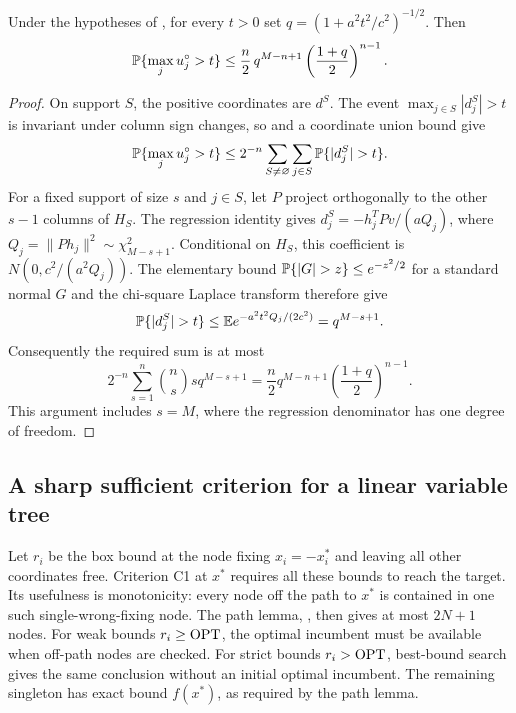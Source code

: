 \begin{theorem}
\label{bls:nnls-tail}
Under the hypotheses of , for every $t>0$ set
$q=(1+a^2t^2/c^2)^{-1/2}$.  Then
\begin{equation}
 \mathbb{P}\{\max_j u_j^\circ>t\}
 \le\frac n2\,q^{M-n+1}\left(\frac{1+q}{2}\right)^{n-1}.
 \label{bls:maximum-tail}
\end{equation}
\end{theorem}

\begin{proof}
On support $S$, the positive coordinates are $d^S$.  The event
$\max_{j\in S}|d_j^S|>t$ is invariant under column sign changes, so
 and a coordinate union bound give
\[
 \Pbb\{\max_j u_j^\circ>t\}
 \le2^{-n}\sum_{S\ne\varnothing}\sum_{j\in S}
                   \Pbb\{|d_j^S|>t\}.
\]
For a fixed support of size $s$ and $j\in S$, let $P$ project orthogonally
to the other $s-1$ columns of $H_S$.  The regression identity gives
$d_j^S=-h_j^TPv/(aQ_j)$, where $Q_j=\|Ph_j\|^2\sim\chi^2_{M-s+1}$.
Conditional on $H_S$, this coefficient is
$N(0,c^2/(a^2Q_j))$.  The elementary bound
$\Pbb\{|G|>z\}\le e^{-z^2/2}$ for a standard normal $G$ and the
chi-square Laplace transform therefore give
\[
 \Pbb\{|d_j^S|>t\}
 \le\E e^{-a^2t^2Q_j/(2c^2)}=q^{M-s+1}.
\]
Consequently the required sum is at most
\[
 2^{-n}\sum_{s=1}^n\binom ns s q^{M-s+1}
 =\frac n2 q^{M-n+1}\left(\frac{1+q}{2}\right)^{n-1}.
\]
This argument includes $s=M$, where the regression denominator has one
degree of freedom.
\end{proof}

\subsection{A sharp sufficient criterion for a linear variable tree}
\label{bls:linear-trees}

Let $r_i$ be the box bound at the node fixing $x_i=-x_i^*$ and leaving
all other coordinates free.  Criterion C1 at $x^*$ requires all these
bounds to reach the target.  Its usefulness is monotonicity: every node
off the path to $x^*$ is contained in one such single-wrong-fixing node.
The path lemma, , then gives at most $2N+1$ nodes.
For weak bounds $r_i\ge\operatorname{OPT}$, the optimal incumbent must be available
when off-path nodes are checked.  For strict bounds $r_i>\operatorname{OPT}$, best-bound
search gives the same conclusion without an initial optimal incumbent.
The remaining singleton has exact bound $f(x^*)$, as required by the
path lemma.

